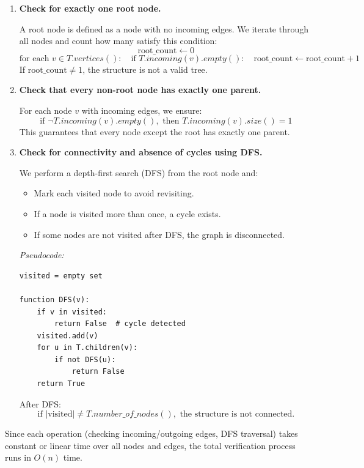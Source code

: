 \documentclass{article}
\begin{document}
\begin{enumerate}
    \item \textbf{Check for exactly one root node.}
    
    A root node is defined as a node with no incoming edges. We iterate through all nodes and count how many satisfy this condition:
    \[
    \text{root\_count} \gets 0
    \]
    \[
    \text{for each } v \in T.vertices(): \quad \text{if } T.incoming(v).empty(): \quad \text{root\_count} \gets \text{root\_count} + 1
    \]
    If $\text{root\_count} \ne 1$, the structure is not a valid tree.

    \item \textbf{Check that every non-root node has exactly one parent.}
    
    For each node $v$ with incoming edges, we ensure:
    \[
    \text{if } \neg T.incoming(v).empty(), \text{ then } T.incoming(v).size() = 1
    \]
    This guarantees that every node except the root has exactly one parent.

    \item \textbf{Check for connectivity and absence of cycles using DFS.}
    
    We perform a depth-first search (DFS) from the root node and:
    \begin{itemize}
        \item Mark each visited node to avoid revisiting.
        \item If a node is visited more than once, a cycle exists.
        \item If some nodes are not visited after DFS, the graph is disconnected.
    \end{itemize}

    \textit{Pseudocode:}
    \begin{verbatim}
visited = empty set

function DFS(v):
    if v in visited:
        return False  # cycle detected
    visited.add(v)
    for u in T.children(v):
        if not DFS(u):
            return False
    return True
    \end{verbatim}

    After DFS:
    \[
    \text{if } |\text{visited}| \ne T.number\_of\_nodes(), \text{ the structure is not connected.}
    \]
\end{enumerate}

\noindent
Since each operation (checking incoming/outgoing edges, DFS traversal) takes constant or linear time over all nodes and edges, the total verification process runs in $O(n)$ time.
\end{document}

